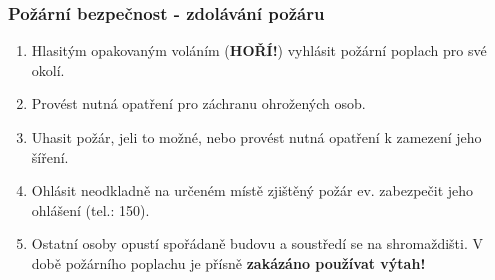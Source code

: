 \documentclass{beamer}
\begin{document}
	\begin{frame}
    \frametitle{Požární bezpečnost - zdolávání požáru}
		\begin{enumerate}
		\item Hlasitým opakovaným voláním (\textbf{HOŘÍ!}) vyhlásit požární poplach pro své okolí.
		\item Provést nutná opatření pro záchranu ohrožených osob.
    \item Uhasit požár, je\-li to možné, nebo provést nutná opatření k zamezení jeho šíření.
    \item Ohlásit neodkladně na určeném místě zjištěný požár ev. zabezpečit jeho ohlášení (tel.: 150).
    \item Ostatní osoby opustí spořádaně budovu a soustředí se na shromaždišti. V době požárního poplachu je přísně \textbf{zakázáno používat výtah!}
		\end{enumerate}
	\end{frame}
\end{document}
